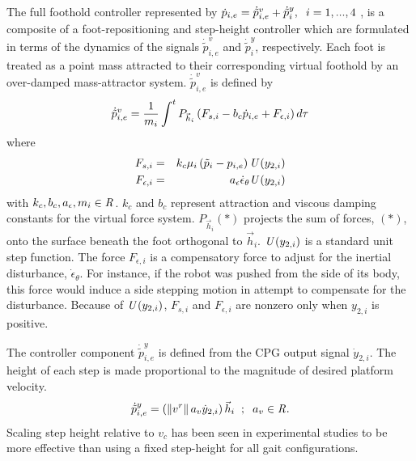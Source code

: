 %
		The full foothold controller represented by $\dot{p}_{i,e} = \dot{\tilde{p}}_{i,e}^{v} + \dot{\tilde{p}}_{i}^{y}, \hspace{2mm} i = 1,...,4$ , is a composite of a foot-repositioning and step-height controller which are formulated in terms of the dynamics of the signals $\dot{\tilde{p}}_{i,e}^{v}$ and $\dot{\tilde{p}}_{i}^{y}$, respectively. Each foot is treated as a point mass attracted to their corresponding virtual foothold by an over-damped mass-attractor system. $\dot{\tilde{p}}_{i,e}^{v}$ is defined by
			\begin{equation}
				\label{eq::FootControl}
				\dot{\tilde{p}}_{i,e}^{v} 		= \frac{1}{m_{i}} \int^t{{P}_{\vec{h}_{i}} \left( F_{s,i}  -b_{c} \dot{p}_{i,e} + F_{\epsilon,i} \right) d\tau}
			\end{equation}
		where
			\begin{eqnarray*}
				F_{s,i} 			& = & k_{c}  \mu_{i} \left( \tilde{p}_{i} - {p}_{i,e} \right) \emph{U}\left(y_{2,i}\right)		\nonumber\\
				F_{\epsilon,i}		& = & a_{\epsilon}\dot{\epsilon}_{\theta} \emph{U}\left(y_{2,i}\right)						\nonumber
			\end{eqnarray*}
	 	with $k_{c},b_{c},a_{\epsilon},m_{i} \in\emph{R}^{}$.
		$k_{c}$ and $b_{c}$ represent  attraction and viscous damping constants for the virtual force system. ${P}_{\vec{h}_{i}}(*)$ projects the sum of  forces, $(*)$, onto the surface beneath the \Ith foot orthogonal to $\vec{h}_{i}$. $\emph{U}\left(y_{2,i}\right)$ is a standard unit step function. The force $F_{\epsilon,i}$ is a compensatory force to adjust for the inertial disturbance,  $\dot{\epsilon}_{\theta}$. For instance, if the robot was pushed from the side of its body, this force would induce a side stepping motion in attempt to compensate for the disturbance. Because of $\emph{U}\left(y_{2,i}\right)$, $F_{s,i}$ and $F_{\epsilon,i}$ are nonzero only when $y_{2,i}$ is positive.

		The controller component $\dot{\tilde{p}}_{i,e}^{y}$ is defined from the CPG output signal $\dot{y}_{2,i}$. The height of each step is made proportional to the magnitude of desired platform velocity.
		\begin{equation}
			\dot{\tilde{p}}_{i,e}^{y} 	= \left( \left\lVert v^{r}\right\rVert a_{v} \dot{y}_{2,i}\right) \vec{h}_{i} 	\hspace{2mm} ; \hspace{2mm} a_{v}  \in\emph{R}^{}.
			\label{eq::FootControl}
		\end{equation}
		Scaling step height relative to $v_c$ has been seen in experimental studies to be more effective than using a fixed step-height for all gait configurations. %




